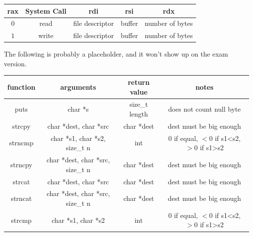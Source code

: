 \documentclass[letterpaper,12pt]{exam}
\begin{document}
\begin{tabular}{| c | c | c | c| c |}
 \hline
    rax & System Call & rdi & rsi & rdx \\
    \hline
    $0$ & read & file descriptor & buffer & number of bytes \\
    \hline
    $1$ & write & file descriptor & buffer & number of bytes \\
    \hline
\end{tabular}
\par
\vspace{0.5in}
The following is probably a placeholder, and it won't show up on the exam version.\\
\begin{tabular}{|c|c|c|c|}
    \hline
   function & arguments & return value & notes\\    
    \hline
    puts & char *s & size\_t length & does not count null byte \\
    \hline
    strcpy & char *dest, char *src & char *dest & dest must be big enough \\
    \hline
    strncmp & char *s1, char *s2, size\_t n & int & 0 if equal, $<$0 if s1<s2, $>$0 if s1>s2 \\
    \hline
    strncpy & char *dest, char *src, size\_t n & char *dest & dest must be big enough \\
    \hline
    strcat & char *dest, char *src & char *dest & dest must be big enough \\
    \hline
    strncat & char *dest, char *src, size\_t n & char *dest & dest must be big enough \\
    \hline
    strcmp & char *s1, char *s2 & int & 0 if equal, $<$0 if s1<s2, $>$0 if s1>s2 \\
    \hline
\end{tabular}
   \twocolumn
\end{document}
